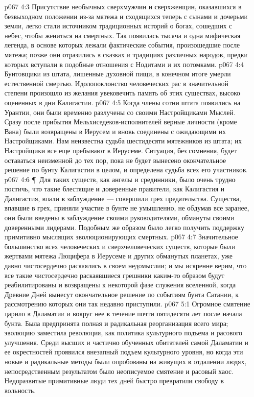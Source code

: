 \vs p067 4:3 Присутствие необычных сверхмужчин и сверхженщин, оказавшихся в безвыходном положении из\hyp{}за мятежа и сходящихся теперь с сынами и дочерьми земли, легко стали источником традиционных историй о богах, сошедших с небес, чтобы жениться на смертных. Так появилась тысяча и одна мифическая легенда, в основе которых лежали фактические события, произошедшие после мятежа; позже они отразились в сказках и традициях различных народов, предки которых вступали в подобные отношения с Нодитами и их потомками.
\vs p067 4:4 Бунтовщики из штата, лишенные духовной пищи, в конечном итоге умерли естественной смертью. Идолопоклонство человеческих рас в значительной степени произошло из желания увековечить память об этих существах, высоко оцененных в дни Калигастии.
\vs p067 4:5 Когда члены сотни штата появились на Урантии, они были временно разлучены со своими Настройщиками Мыслей. Сразу после прибытия Мельхиседеков\hyp{}исполнителей верные личности (кроме Вана) были возвращены в Иерусем и вновь соединены с ожидающими их Настройщиками. Нам неизвестна судьба шестидесяти мятежников из штата; их Настройщики все еще пребывают в Иерусеме. Ситуация, без сомнения, будет оставаться неизменной до тех пор, пока не будет вынесено окончательное решение по бунту Калигастии в целом, и определена судьба всех его участников.
\vs p067 4:6 \P\ Для таких существ, как ангелы и срединники, было очень трудно постичь, что такие блестящие и доверенные правители, как Калигастия и Далигастия, впали в заблуждение --- совершили грех предательства. Существа, впавшие в грех, приняли участие в бунте не умышленно, не обдумав все заранее, они были введены в заблуждение своими руководителями, обмануты своими доверенными лидерами. Подобным же образом было легко получить поддержку примитивно мыслящих эволюционирующих смертных.
\vs p067 4:7 Значительное большинство всех человеческих и сверхчеловеческих существ, которые были жертвами мятежа Люцифера в Иерусеме и других обманутых планетах, уже давно чистосердечно раскаялись в своем недомыслии; и мы искренне верим, что все такие чистосердечно раскаявшиеся грешники каким\hyp{}то образом будут реабилитированы и возвращены к некоторой фазе служения вселенной, когда Древние Дней вынесут окончательное решение по событиям бунта Сатании, к рассмотрению которых они так недавно приступили.
\vs p067 5:1 Огромное смятение царило в Даламатии и вокруг нее в течение почти пятидесяти лет после начала бунта. Была предпринята полная и радикальная реорганизация всего мира; эволюцию заместила революция, как политика культурного подъема и расового улучшения. Среди высших и частично обученных обитателей самой Даламатии и ее окрестностей проявился внезапный подъем культурного уровня, но когда эти новые и радикальные методы были опробованы на живущих в отдалении людях, непосредственным результатом было неописуемое смятение и расовый хаос. Недоразвитые примитивные люди тех дней быстро превратили свободу в вольность.
